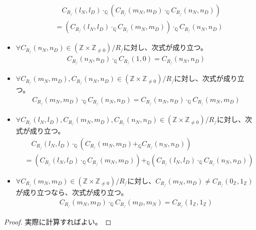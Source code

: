 \documentclass[dvipdfmx]{jsarticle}
\begin{document}
\begin{thm}
\begin{itemize}
\begin{align*}
&\quad C_{R_{/}}\left( l_{N},l_{D} \right) \cdot_{\mathbb{Q}}\left( C_{R_{/}}\left( m_{N},m_{D} \right) \cdot_{\mathbb{Q}}C_{R_{/}}\left( n_{N},n_{D} \right) \right) \\
&= \left( C_{R_{/}}\left( l_{N},l_{D} \right) \cdot_{\mathbb{Q}}C_{R_{/}}\left( m_{N},m_{D} \right) \right) \cdot_{\mathbb{Q}}C_{R_{/}}\left( n_{N},n_{D} \right)
\end{align*}
\item
  $\forall C_{R_{/}}\left( n_{N},n_{D} \right) \in \left( \mathbb{Z} \times \mathbb{Z}_{\neq 0} \right) /R_{/} $に対し、次式が成り立つ。
\begin{align*}
C_{R_{/}}\left( n_{N},n_{D} \right) \cdot_{\mathbb{Q}}C_{R_{/}}(1,0) = C_{R_{/}}\left( n_{N},n_{D} \right)
\end{align*}
\item
  $\forall C_{R_{/}}\left( m_{N},m_{D} \right),C_{R_{/}}\left( n_{N},n_{D} \right) \in \left( \mathbb{Z} \times \mathbb{Z}_{\neq 0} \right) /R_{/} $に対し、次式が成り立つ。
\begin{align*}
C_{R_{/}}\left( m_{N},m_{D} \right) \cdot_{\mathbb{Q}}C_{R_{/}}\left( n_{N},n_{D} \right) = C_{R_{/}}\left( n_{N},n_{D} \right) \cdot_{\mathbb{Q}}C_{R_{/}}\left( m_{N},m_{D} \right)
\end{align*}
\item
  $\forall C_{R_{/}}\left( l_{N},l_{D} \right),C_{R_{/}}\left( m_{N},m_{D} \right),C_{R_{/}}\left( n_{N},n_{D} \right) \in \left( \mathbb{Z} \times \mathbb{Z}_{\neq 0} \right) /R_{/} $に対し、次式が成り立つ。
\begin{align*}
&\quad C_{R_{/}}\left( l_{N},l_{D} \right) \cdot_{\mathbb{Q}}\left( C_{R_{/}}\left( m_{N},m_{D} \right) +_{\mathbb{Q}}C_{R_{/}}\left( n_{N},n_{D} \right) \right) \\
&= \left( C_{R_{/}}\left( l_{N},l_{D} \right) \cdot_{\mathbb{Q}}C_{R_{/}}\left( m_{N},m_{D} \right) \right) +_{\mathbb{Q}}\left( C_{R_{/}}\left( l_{N},l_{D} \right) \cdot_{\mathbb{Q}}C_{R_{/}}\left( n_{N},n_{D} \right) \right)
\end{align*}
\item
  $\forall C_{R_{/}}\left( m_{N},m_{D} \right) \in \left( \mathbb{Z} \times \mathbb{Z}_{\neq 0} \right) /R_{/} $に対し、$C_{R_{/}}\left( m_{N},m_{D} \right) \neq C_{R_{/}}\left( 0_{\mathbb{Z}},1_{\mathbb{Z}} \right)$が成り立つなら、次式が成り立つ。
\begin{align*}
C_{R_{/}}\left( m_{N},m_{D} \right) \cdot_{\mathbb{Q}}C_{R_{/}}\left( m_{D},m_{N} \right) = C_{R_{/}}\left( 1_{\mathbb{Z}},1_{\mathbb{Z}} \right)
\end{align*}
\end{itemize}
\end{thm}
\begin{proof}
実際に計算すればよい。
\end{proof}
\end{document}

